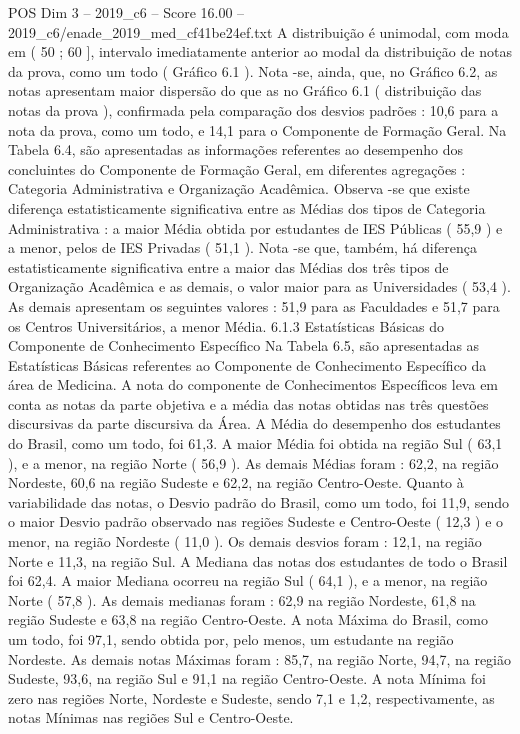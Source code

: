 \begin{textsample}{POS Dim 3 – 2019\_c6 – Score 16.00 – 2019\_c6/enade\_2019\_med\_cf41be24ef.txt}
A distribuição é unimodal, com moda em ( 50 ; 60 ], intervalo imediatamente anterior ao modal da distribuição de notas da prova, como um todo ( Gráfico 6.1 ).
Nota -se, ainda, que, no Gráfico 6.2, as notas apresentam maior dispersão do que as no Gráfico 6.1 ( distribuição das notas da prova ), confirmada pela comparação dos desvios padrões : 10,6 para a nota da prova, como um todo, e 14,1 para o Componente de Formação Geral.
Na Tabela 6.4, são apresentadas as informações referentes ao desempenho dos concluintes do Componente de Formação Geral, em diferentes agregações : Categoria Administrativa e Organização Acadêmica.
Observa -se que existe diferença estatisticamente significativa entre as Médias dos tipos de Categoria Administrativa : a maior Média obtida por estudantes de IES Públicas ( 55,9 ) e a menor, pelos de IES Privadas ( 51,1 ).
Nota -se que, também, há diferença estatisticamente significativa entre a maior das Médias dos três tipos de Organização Acadêmica e as demais, o valor maior para as Universidades ( 53,4 ).
As demais apresentam os seguintes valores : 51,9 para as Faculdades e 51,7 para os Centros Universitários, a menor Média. 6.1.3 Estatísticas Básicas do Componente de Conhecimento Específico Na Tabela 6.5, são apresentadas as Estatísticas Básicas referentes ao Componente de Conhecimento Específico da área de Medicina.
A nota do componente de Conhecimentos Específicos leva em conta as notas da parte objetiva e a média das notas obtidas nas três questões discursivas da parte discursiva da Área.
A Média do desempenho dos estudantes do Brasil, como um todo, foi 61,3.
A maior Média foi obtida na região Sul ( 63,1 ), e a menor, na região Norte ( 56,9 ).
As demais Médias foram : 62,2, na região Nordeste, 60,6 na região Sudeste e 62,2, na região Centro-Oeste.
Quanto à variabilidade das notas, o Desvio padrão do Brasil, como um todo, foi 11,9, sendo o maior Desvio padrão observado nas regiões Sudeste e Centro-Oeste ( 12,3 ) e o menor, na região Nordeste ( 11,0 ).
Os demais desvios foram : 12,1, na região Norte e 11,3, na região Sul.
A Mediana das notas dos estudantes de todo o Brasil foi 62,4.
A maior Mediana ocorreu na região Sul ( 64,1 ), e a menor, na região Norte ( 57,8 ).
As demais medianas foram : 62,9 na região Nordeste, 61,8 na região Sudeste e 63,8 na região Centro-Oeste.
A nota Máxima do Brasil, como um todo, foi 97,1, sendo obtida por, pelo menos, um estudante na região Nordeste.
As demais notas Máximas foram : 85,7, na região Norte, 94,7, na região Sudeste, 93,6, na região Sul e 91,1 na região Centro-Oeste.
A nota Mínima foi zero nas regiões Norte, Nordeste e Sudeste, sendo 7,1 e 1,2, respectivamente, as notas Mínimas nas regiões Sul e Centro-Oeste.

\end{textsample}
